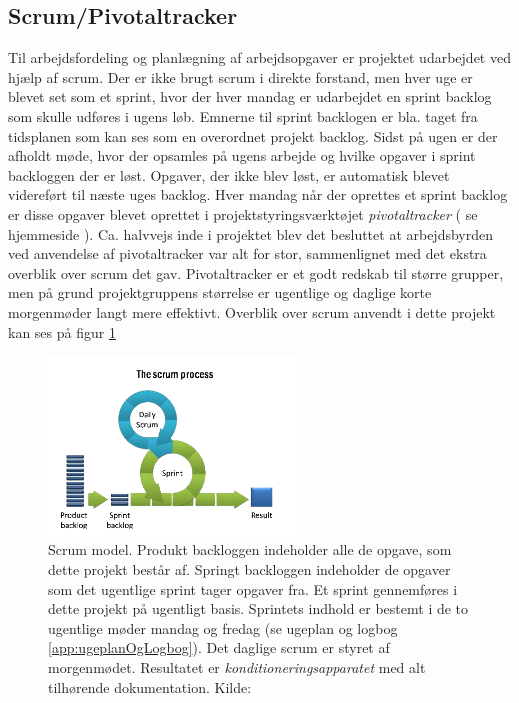 \subsection{Scrum/Pivotaltracker} \label{title:scrum}
Til arbejdsfordeling og planlægning af arbejdsopgaver er projektet udarbejdet ved hjælp af scrum. Der er ikke brugt scrum i direkte forstand, men hver uge er blevet set som et sprint, hvor der hver mandag er udarbejdet en sprint backlog som skulle udføres i ugens løb. Emnerne til sprint backlogen er bla. taget fra tidsplanen som kan ses som en overordnet projekt backlog. Sidst på ugen er der afholdt møde, hvor der opsamles på ugens arbejde og hvilke opgaver i sprint backloggen der er løst. Opgaver, der ikke blev løst, er automatisk blevet videreført til næste uges backlog. Hver mandag når der oprettes et sprint backlog er disse opgaver blevet oprettet i projektstyringsværktøjet \textit{pivotaltracker} ( se hjemmeside \cite{RefWorks:36}). Ca. halvvejs inde i projektet blev det besluttet at arbejdsbyrden ved anvendelse af pivotaltracker var alt for stor, sammenlignet med det ekstra overblik over scrum det gav. Pivotaltracker er et godt redskab til større grupper, men på grund projektgruppens størrelse er ugentlige og daglige korte morgenmøder langt mere effektivt. Overblik over scrum anvendt i dette projekt kan ses på figur \ref{fig:scrumProcess}

	\begin{figure}[H]
		\centering
		\includegraphics[width = 0.6\textwidth]{billeder/scrumProcess.png}
		\caption{Scrum model. Produkt backloggen indeholder alle de opgave, som dette projekt består af. Springt backloggen indeholder de opgaver som det ugentlige sprint tager opgaver fra. Et sprint gennemføres i dette projekt på ugentligt basis. Sprintets indhold er bestemt i de to ugentlige møder mandag og fredag (se ugeplan og logbog \ref{app:ugeplanOgLogbog}). Det daglige scrum er styret af morgenmødet. Resultatet er \textit{konditioneringsapparatet} med alt tilhørende dokumentation. Kilde: \cite{Billede:1}}\label{fig:scrumProcess}
	\end{figure}

